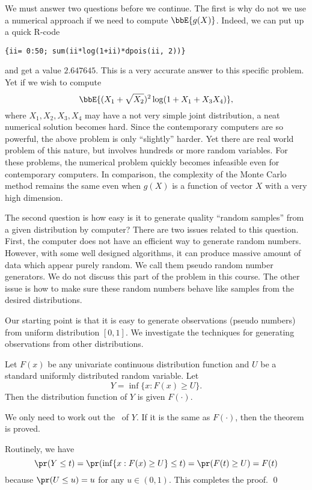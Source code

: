 We must answer two questions before we continue. 
The first is why do not we use a numerical approach
if we need to compute $\bbE\{g(X)\}$. 
Indeed, we can put up a quick R-code
\begin{verbatim}
{ii= 0:50; sum(ii*log(1+ii)*dpois(ii, 2))} 
\end{verbatim}
and get a value $2.647645$.
This is a very accurate answer to this specific problem.
Yet if we wish to compute 
\[
\bbE\{ (X_1+ \sqrt{X_2})^2 \log(1+ X_1 + X_3X_4)\},
\]
where $X_1, X_2, X_3, X_4$ may have a not very simple
joint distribution,
a neat numerical solution becomes hard.
Since the contemporary computers are so powerful,
the above problem is only ``slightly'' harder. Yet there are
real world problem of this nature, but involves hundreds
or more random variables. For these problems, the
numerical problem quickly becomes infeasible even for
contemporary computers.
In comparison, the complexity of the Monte Carlo method remains
the same even when $g(X)$ is a function of vector $X$ with
a very high dimension.

The second question is how easy is it to generate quality ``random
samples'' from a given distribution by computer? There are two issues
related to this question. First, the computer does not have an efficient
way to generate random numbers. However, with some well designed
algorithms, it can produce massive amount of data which appear
purely random. We call them pseudo random number generators.
We do not discuss this part of the problem in this course.
The other issue is how to make sure these random numbers behave
like samples from the desired distributions. 

Our starting point is that it is easy to generate \iid observations
(pseudo numbers) from uniform distribution $[0, 1]$.
We investigate the techniques for generating  \iid observations
from other distributions.

\begin{theorem}
Let $F(x)$ be any univariate continuous distribution function
and $U$ be a standard uniformly distributed random variable.
Let
\[
Y = \inf \{x: F(x) \geq U\}.
\]
Then the distribution function of $Y$ is given $F(\cdot)$.
\end{theorem}

\proof We only need to work out the \cdf\ of $Y$. If it is the
same as $F(\cdot)$, then the theorem is proved.

Routinely, we have
\[
\pr(Y \leq t) = 
\pr(\inf \{x: F(x) \geq U\} \leq t)
= 
\pr( F(t) \geq U )
= F(t)
\]
because $\pr(U \leq u) = u$ for any $u \in (0, 1)$.
This completes the proof. \qed

